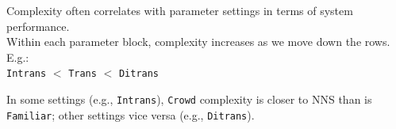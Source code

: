 \documentclass[xcolor={dvipsnames}]{beamer}
\newcommand{\param}[1]{\texttt{#1}}
\begin{document}
\begin{frame}
\begin{columns}
\begin{column}{0.5\textwidth}
\pause
Complexity often correlates with parameter settings in terms of system performance. \\

\vspace{.8em}
\pause
Within each parameter block, complexity increases as we move down the rows. E.g.: \\
\vspace{.3em}
\pause
\param{Intrans} $<$ \param{Trans} $<$ \param{Ditrans} \\
\vspace{.8em}

\pause
In some settings (e.g., \param{Intrans}), \param{Crowd} complexity is closer to NNS than is \param{Familiar}; other settings vice versa (e.g., \param{Ditrans}). \\
 
\end{column}
\end{columns}

\end{frame}
\end{document}
